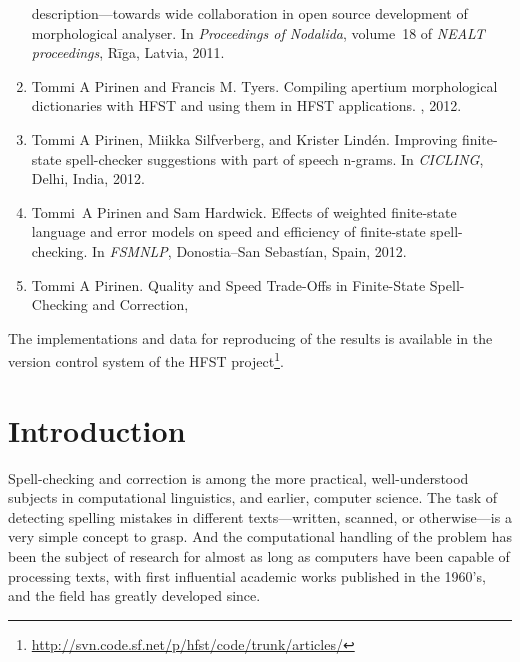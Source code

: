 \documentclass[officiallayout]{unihelcompling}
\newcommand\misspelt{\bgroup\markoverwith
{\textcolor{red}{\lower3.5pt\hbox{\sixly \char58}}}\ULon}
\begin{document}
\begin{enumerate}
        description—towards wide collaboration in open source development of
        morphological analyser.
        \newblock In {\em Proceedings of Nodalida}, volume~18 of {\em NEALT
        proceedings}, Rīga, Latvia, 2011.
    \item[\citetalias{pirinen2012compiling}]
        Tommi A Pirinen and Francis M. Tyers.
        \newblock Compiling apertium morphological dictionaries with HFST and
        using them in HFST applications.
        , 2012.
    \item[\citetalias{pirinen2012improving}]
        Tommi A Pirinen, Miikka Silfverberg, and Krister Lindén.
        \newblock Improving finite-state spell-checker suggestions with part of
        speech n-grams.
        \newblock In {\em CICLING}, Delhi, India, 2012.
    \item[\citetalias{pirinen2012effects}]
        Tommi~A Pirinen and Sam Hardwick.
        \newblock Effects of weighted finite-state language and error models on
        speed and efficiency of finite-state spell-checking.
        \newblock In {\em FSMNLP}, Donostia--San Sebastían, Spain, 2012.
    \item[\citetalias{pirinen2013quality}]
        Tommi A Pirinen.
        \newblock Quality and Speed Trade-Offs in
        Finite-State Spell-Checking and Correction, \misspelt{forthcoming}
\end{enumerate}

The implementations and data for reproducing of the results is available
in the version control system of the HFST project\footnote{\url{http://svn.code.sf.net/p/hfst/code/trunk/articles/}}.

\tableofcontents

\listoftodos

\chapter{Introduction}
\label{chap:introduction}

Spell-checking and correction is among the more practical, well-understood
subjects in computational linguistics, and earlier, computer science.
The task of detecting spelling mistakes in different texts---written, scanned,
or otherwise---is a very simple concept to grasp. And the computational
handling of the problem has been the subject of research for almost as long as
computers have been capable of processing texts, with first influential
academic works published in the 1960's, and the field has greatly developed
since.
\end{document}
